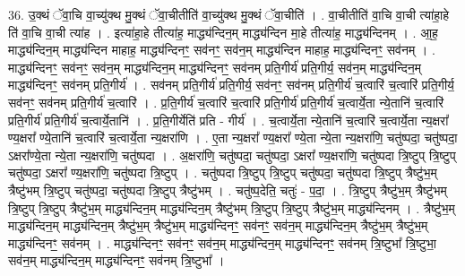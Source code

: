 \documentclass[17pt]{extarticle}
\begin{document}
36. उ॒क्थं ॅवा॒चि वा॒च्यु॑क्थ मु॒क्थं ॅवा॒चीतीति॑ वा॒च्यु॑क्थ मु॒क्थं ॅवा॒चीति॑ । . वा॒चीतीति॑ वा॒चि वा॒ची त्या॑हा॒हे ति॑ वा॒चि वा॒ची त्या॑ह । . इत्या॑हा॒हे तीत्या॑ह॒ माद्ध्य॑न्दिन॒म् माद्ध्य॑न्दिन मा॒हे तीत्या॑ह॒ माद्ध्य॑न्दिनम् । . आ॒ह॒ माद्ध्य॑न्दिन॒म् माद्ध्य॑न्दिन माहाह॒ माद्ध्य॑न्दिनꣳ॒॒ सव॑नꣳ॒॒ सव॑न॒म् माद्ध्य॑न्दिन माहाह॒ माद्ध्य॑न्दिनꣳ॒॒ सव॑नम् । . माद्ध्य॑न्दिनꣳ॒॒ सव॑नꣳ॒॒ सव॑न॒म् माद्ध्य॑न्दिन॒म् माद्ध्य॑न्दिनꣳ॒॒ सव॑नम् प्रति॒गीर्य॑ प्रति॒गीर्य॒ सव॑न॒म् माद्ध्य॑न्दिन॒म् माद्ध्य॑न्दिनꣳ॒॒ सव॑नम् प्रति॒गीर्य॑ । . सव॑नम् प्रति॒गीर्य॑ प्रति॒गीर्य॒ सव॑नꣳ॒॒ सव॑नम् प्रति॒गीर्य॑ च॒त्वारि॑ च॒त्वारि॑ प्रति॒गीर्य॒ सव॑नꣳ॒॒ सव॑नम् प्रति॒गीर्य॑ च॒त्वारि॑ । . प्र॒ति॒गीर्य॑ च॒त्वारि॑ च॒त्वारि॑ प्रति॒गीर्य॑ प्रति॒गीर्य॑ च॒त्वार्ये॒ता न्ये॒तानि॑ च॒त्वारि॑ प्रति॒गीर्य॑ प्रति॒गीर्य॑ च॒त्वार्ये॒तानि॑ । . प्र॒ति॒गीर्येति॑ प्रति - गीर्य॑ । . च॒त्वार्ये॒ता न्ये॒तानि॑ च॒त्वारि॑ च॒त्वार्ये॒ता न्य॒क्षरा᳚ ण्य॒क्षरा᳚ ण्ये॒तानि॑ च॒त्वारि॑ च॒त्वार्ये॒ता न्य॒क्षरा॑णि । . ए॒ता न्य॒क्षरा᳚ ण्य॒क्षरा᳚ ण्ये॒ता न्ये॒ता न्य॒क्षरा॑णि॒ चतु॑ष्पदा॒ चतु॑ष्पदा॒ ऽक्षरा᳚ण्ये॒ता न्ये॒ता न्य॒क्षरा॑णि॒ चतु॑ष्पदा । . अ॒क्षरा॑णि॒ चतु॑ष्पदा॒ चतु॑ष्पदा॒ ऽक्षरा᳚ ण्य॒क्षरा॑णि॒ चतु॑ष्पदा त्रि॒ष्टुप् त्रि॒ष्टुप् 
चतु॑ष्पदा॒ ऽक्षरा᳚ ण्य॒क्षरा॑णि॒ चतु॑ष्पदा त्रि॒ष्टुप् । . चतु॑ष्पदा त्रि॒ष्टुप् त्रि॒ष्टुप् चतु॑ष्पदा॒ चतु॑ष्पदा त्रि॒ष्टुप् त्रैष्टु॑भ॒म् त्रैष्टु॑भम् त्रि॒ष्टुप् चतु॑ष्पदा॒ चतु॑ष्पदा त्रि॒ष्टुप् त्रैष्टु॑भम् । . चतु॑ष्प॒देति॒ चतुः॑ - प॒दा॒ । . त्रि॒ष्टुप् त्रैष्टु॑भ॒म् त्रैष्टु॑भम् त्रि॒ष्टुप् त्रि॒ष्टुप् त्रैष्टु॑भ॒म् माद्ध्य॑न्दिन॒म् माद्ध्य॑न्दिन॒म् त्रैष्टु॑भम् त्रि॒ष्टुप् त्रि॒ष्टुप् त्रैष्टु॑भ॒म् माद्ध्य॑न्दिनम् । . त्रैष्टु॑भ॒म् माद्ध्य॑न्दिन॒म् माद्ध्य॑न्दिन॒म् त्रैष्टु॑भ॒म् त्रैष्टु॑भ॒म् माद्ध्य॑न्दिनꣳ॒॒ सव॑नꣳ॒॒ सव॑न॒म् माद्ध्य॑न्दिन॒म् त्रैष्टु॑भ॒म् त्रैष्टु॑भ॒म् माद्ध्य॑न्दिनꣳ॒॒ सव॑नम् । . माद्ध्य॑न्दिनꣳ॒॒ सव॑नꣳ॒॒ सव॑न॒म् माद्ध्य॑न्दिन॒म् माद्ध्य॑न्दिनꣳ॒॒ सव॑नम् त्रि॒ष्टुभा᳚ त्रि॒ष्टुभा॒ सव॑न॒म् माद्ध्य॑न्दिन॒म् माद्ध्य॑न्दिनꣳ॒॒ सव॑नम् त्रि॒ष्टुभा᳚ । \newline
\end{document}
